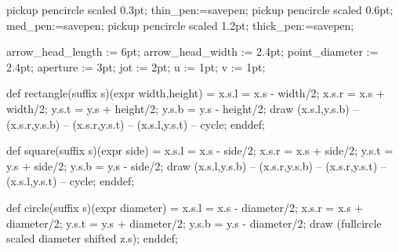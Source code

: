 \newdimen\gutter \gutter=5mm %
\newbox\partialpage
\def\begindoublecolumns{\begingroup
 \output={\global\setbox\partialpage=\vbox{\unvbox255\bigskip}}\eject
 \output={\doublecolumnout}%
 \hsize=\fullhsize \advance\hsize by-\gutter \divide\hsize by2
 \vsize=\fullvsize \multiply\vsize by2 \advance\vsize by1pc}
\def\enddoublecolumns{\output={\balancecolumns}\eject
 \endgroup \pagegoal=\vsize}

\def\doublecolumnout{\splittopskip=\topskip \splitmaxdepth=\maxdepth
 \dimen0=\fullvsize \advance\dimen0 by-\ht\partialpage
 \setbox0=\vsplit255 to\dimen0 \setbox2=\vsplit255 to\dimen0
 \shipout\vbox{\vbox to0pt{\vskip-22.5pt
  \fullline{\vbox to8.5pt{}\the\headline}\vss}\nointerlineskip
  \vbox to\fullvsize{\boxmaxdepth=\maxdepth \pagesofar}
  \baselineskip=24pt \fullline{\the\footline}}\advancepageno
 \unvbox255 \penalty\outputpenalty}
\def\balancecolumns{\setbox0=\vbox{\unvbox255}\dimen0=\ht0
 \advance\dimen0 by\topskip \advance\dimen0 by-\baselineskip
 \divide\dimen0 by2 \splittopskip=\topskip
 {\vbadness=10000 \loop \global\setbox3=\copy0
  \global\setbox1=\vsplit3 to\dimen0
  \ifdim\ht3>\dimen0 \global\advance\dimen0 by1pt \repeat}
 \setbox0=\vbox to\dimen0{\unvbox1}%
 \setbox2=\vbox to\dimen0{\dimen2=\dp3 \unvbox3 \kern-\dimen2 \vfil}%
 \pagesofar}
\def\pagesofar{\unvbox\partialpage \fullline{\box0\hfil\box2}}


\def\MTendmark{:::}

\MTcode
pickup pencircle scaled 0.3pt; thin_pen:=savepen;
pickup pencircle scaled 0.6pt; med_pen:=savepen;
pickup pencircle scaled 1.2pt; thick_pen:=savepen;

arrow_head_length := 6pt; arrow_head_width := 2.4pt;
point_diameter := 2.4pt; aperture := 3pt; jot := 2pt;
u := 1pt; v := 1pt;

def rectangle(suffix s)(expr width,height) =
 x.s.l = x.s - width/2;
 x.s.r = x.s + width/2;
 y.s.t = y.s + height/2;
 y.s.b = y.s - height/2;
 draw (x.s.l,y.s.b) -- (x.s.r,y.s.b) --
  (x.s.r,y.s.t) -- (x.s.l,y.s.t) -- cycle;
enddef;

def square(suffix s)(expr side) =
 x.s.l = x.s - side/2;
 x.s.r = x.s + side/2;
 y.s.t = y.s + side/2;
 y.s.b = y.s - side/2;
 draw (x.s.l,y.s.b) -- (x.s.r,y.s.b) --
  (x.s.r,y.s.t) -- (x.s.l,y.s.t) -- cycle;
enddef;

def circle(suffix s)(expr diameter) =
 x.s.l = x.s - diameter/2;
 x.s.r = x.s + diameter/2;
 y.s.t = y.s + diameter/2;
 y.s.b = y.s - diameter/2;
 draw (fullcircle scaled diameter shifted z.s);
enddef;

